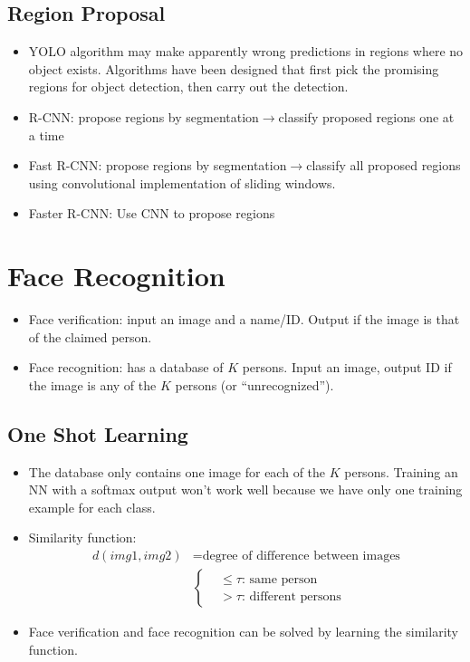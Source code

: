 \subsection{Region Proposal}
\begin{itemize}
  \item YOLO algorithm may make apparently wrong predictions in regions where no object exists. Algorithms have been designed that first pick the promising regions for object detection, then carry out the detection.
  \item R-CNN: propose regions by segmentation$\rightarrow$classify proposed regions one at a time
  \item Fast R-CNN: propose regions by segmentation$\rightarrow$classify all proposed regions using convolutional implementation of sliding windows.
  \item Faster R-CNN: Use CNN to propose regions
\end{itemize}
\section{Face Recognition}
\begin{itemize}
\item Face verification: input an image and a name/ID. Output if the image is that of the claimed person.
\item Face recognition: has a database of $K$ persons. Input an image, output ID if the image is any of the $K$ persons (or ``unrecognized'').
\end{itemize}
\subsection{One Shot Learning}
\begin{itemize}
  \item The database only contains one image for each of the $K$ persons. Training an NN with a softmax output won't work well because we have only one training example for each class.
  \item Similarity function:
  \begin{align*}
  d(img1, img2)&=\text{degree of difference between images}\\
               &\left\{\begin{aligned}
                  &\le \tau\text{: same person}\\
                  &>\tau\text{: different persons}
                \end{aligned}\right.
  \end{align*}
  \item Face verification and face recognition can be solved by learning the similarity function.  
\end{itemize}
